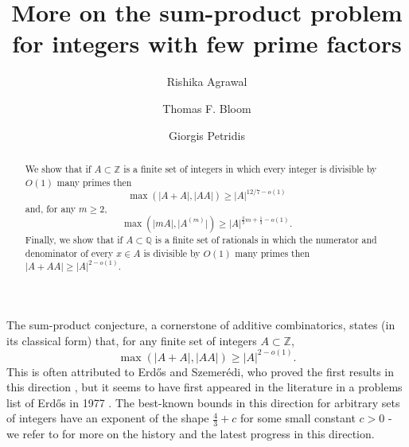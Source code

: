 \documentclass{amsart}
\renewcommand{\geq}{\geqslant}
\newcommand{\bbz}{\mathbb{Z}}
\newcommand{\bbq}{\mathbb{Q}}
\newcommand{\abs}[1]{\left\lvert #1\right\rvert}
\theoremstyle{definition}
\begin{document}
\title[Sum-product problem with few prime factors]{More on the sum-product problem for integers with few prime factors}
\author{Rishika Agrawal}
\address{Department of Mathematics, University of Georgia, Athens, GA, 30602 }
\author{Thomas F. Bloom}
\address{Department of Mathematics, University of Manchester, Manchester, M13 9PL}
\author{Giorgis Petridis}
\address{Department of Mathematics, University of Georgia, Athens, GA, 30602 }

\begin{abstract}
We show that if $A\subset \bbz$ is a finite set of integers in which every integer is divisible by $O(1)$ many primes then
\[\max(\lvert A+A\rvert,\lvert AA\rvert) \geq \lvert A\rvert^{12/7-o(1)}\]
and, for any $m\geq 2$,
\[\max(\lvert mA\rvert, \lvert A^{(m)}\rvert) \geq \lvert A\rvert^{\frac{2}{3}m+\frac{1}{3}-o(1)}.\]
Finally, we show that if $A\subset \bbq$ is a finite set of rationals in which the numerator and denominator of every $x\in A$ is divisible by $O(1)$ many primes then $\lvert A+AA\rvert \geq \lvert A\rvert^{2-o(1)}$.
\end{abstract}

\maketitle


The sum-product conjecture, a cornerstone of additive combinatorics, states (in its classical form) that, for any finite set of integers $A\subset \bbz$, 
\[\max(\abs{A+A},\abs{AA})\geq \abs{A}^{2-o(1)}.\]
This is often attributed to Erd\H{o}s and Szemer\'{e}di, who proved the first results in this direction \cite{ErSz83}, but it seems to have first appeared in the literature in a problems list of Erd\H{o}s in 1977 \cite{Er77}. The best-known bounds in this direction for arbitrary sets of integers have an exponent of the shape $\frac{4}{3}+c$ for some small constant $c>0$ - we refer to \cite{Bl25} for more on the history and the latest progress in this direction.
\end{document}
